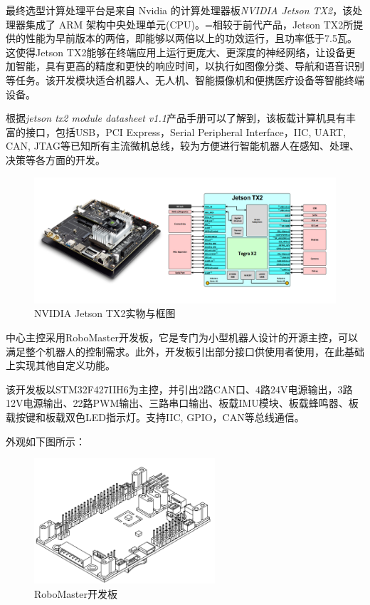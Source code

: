 最终选型计算处理平台是来自 Nvidia 的计算处理器板\emph{NVIDIA Jetson TX2}，该处理器集成了 ARM 架构中央处理单元(CPU)。=相较于前代产品，Jetson TX2所提供的性能为早前版本的两倍，即能够以两倍以上的功效运行，且功率低于7.5瓦。这使得Jetson TX2能够在终端应用上运行更庞大、更深度的神经网络，让设备更加智能，具有更高的精度和更快的响应时间，以执行如图像分类、导航和语音识别等任务。该开发模块适合机器人、无人机、智能摄像机和便携医疗设备等智能终端设备。

根据\emph{jetson tx2 module datasheet v1.1}产品手册可以了解到，该板载计算机具有丰富的接口，包括USB，PCI Express，Serial Peripheral Interface，IIC, UART, CAN, JTAG等已知所有主流微机总线，较为方便进行智能机器人在感知、处理、决策等各方面的开发。

\begin{figure}[H]
	\centering
	\includegraphics[width = 1\textwidth]{fig/tx_2.png}
	\caption{NVIDIA Jetson TX2实物与框图}
	\label{tx2}
\end{figure}

中心主控采用RoboMaster开发板，它是专门为小型机器人设计的开源主控，可以满足整个机器人的控制需求。此外，开发板引出部分接口供使用者使用，在此基础上实现其他自定义功能。

该开发板以STM32F427IIH6为主控，并引出2路CAN口、4路24V电源输出，3路12V电源输出、22路PWM输出、三路串口输出、板载IMU模块、板载蜂鸣器、板载按键和板载双色LED指示灯。支持IIC, GPIO，CAN等总线通信。

外观如下图所示：

\begin{figure}[H]
	\centering
	\includegraphics[width = 0.6\textwidth]{fig/djikf.png}
	\caption{RoboMaster开发板}
	\label{djikf}
\end{figure}


